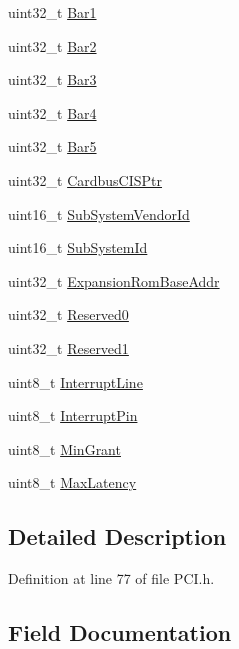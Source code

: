 \begin{DoxyCompactItemize}
uint32\+\_\+t \hyperlink{struct__PciNativeHeader_aa9af6e2520f693035c7db1b08532bbac}{Bar1}
\item 
uint32\+\_\+t \hyperlink{struct__PciNativeHeader_aefeefb8bb0d4d2c8c9d699b146472abb}{Bar2}
\item 
uint32\+\_\+t \hyperlink{struct__PciNativeHeader_a7db6363b61b19d6a52ef679b22f560cb}{Bar3}
\item 
uint32\+\_\+t \hyperlink{struct__PciNativeHeader_a1fdd80a61e6b295ebbe6ba26483c9e2a}{Bar4}
\item 
uint32\+\_\+t \hyperlink{struct__PciNativeHeader_aa18626af4b1e61cb290c6c8fb2e8a895}{Bar5}
\item 
uint32\+\_\+t \hyperlink{struct__PciNativeHeader_a229757839cd81fceafa182234d1ec930}{Cardbus\+C\+I\+S\+Ptr}
\item 
uint16\+\_\+t \hyperlink{struct__PciNativeHeader_aded2bf4a3ea0efc410cf091ae736ae7e}{Sub\+System\+Vendor\+Id}
\item 
uint16\+\_\+t \hyperlink{struct__PciNativeHeader_a890fa8d2edfa526899a3c547f0fff6ee}{Sub\+System\+Id}
\item 
uint32\+\_\+t \hyperlink{struct__PciNativeHeader_aed3842654fc63d6948453582c90c7897}{Expansion\+Rom\+Base\+Addr}
\item 
uint32\+\_\+t \hyperlink{struct__PciNativeHeader_ac6854a65538b035591311219fc52b973}{Reserved0}
\item 
uint32\+\_\+t \hyperlink{struct__PciNativeHeader_a34aafe4c4f8bcc909d2fad92f04c1c6c}{Reserved1}
\item 
uint8\+\_\+t \hyperlink{struct__PciNativeHeader_a5d3013816300453589fefcd1ed9c5cee}{Interrupt\+Line}
\item 
uint8\+\_\+t \hyperlink{struct__PciNativeHeader_aa1d37e93fd702731475ccc0775b048d8}{Interrupt\+Pin}
\item 
uint8\+\_\+t \hyperlink{struct__PciNativeHeader_a5c11c079111e6235bd01540b9affdb8b}{Min\+Grant}
\item 
uint8\+\_\+t \hyperlink{struct__PciNativeHeader_af9a63a39fe2cd333b78e77b0c8a9652e}{Max\+Latency}
\end{DoxyCompactItemize}


\subsection{Detailed Description}


Definition at line 77 of file P\+C\+I.\+h.



\subsection{Field Documentation}
